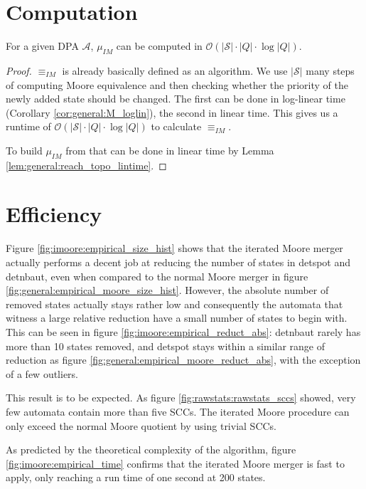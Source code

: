 \section{Computation}
\begin{lem}
	For a given DPA $\mathcal{A}$, $\mu_{IM}$ can be computed in $\mathcal{O}(|\mathcal{S}| \cdot |Q| \cdot \log |Q|)$.
\end{lem}

\begin{proof}
	$\equiv_{IM}$ is already basically defined as an algorithm. We use $|\mathcal{S}|$ many steps of computing Moore equivalence and then checking whether the priority of the newly added state should be changed. The first can be done in log-linear time (Corollary \ref{cor:general:M_loglin}), the second in linear time. This gives us a runtime of $\mathcal{O}(|\mathcal{S}| \cdot |Q| \cdot \log |Q|)$ to calculate $\equiv_{IM}$.

	To build $\mu_{IM}$ from that can be done in linear time by Lemma \ref{lem:general:reach_topo_lintime}.
\end{proof}


\section{Efficiency}
Figure \ref{fig:imoore:empirical_size_hist} shows that the iterated Moore merger actually performs a decent job at reducing the number of states in \textsf{detspot} and \textsf{detnbaut}, even when compared to the normal Moore merger in figure \ref{fig:general:empirical_moore_size_hist}. However, the absolute number of removed states actually stays rather low and consequently the automata that witness a large relative reduction have a small number of states to begin with. This can be seen in figure \ref{fig:imoore:empirical_reduct_abs}: \textsf{detnbaut} rarely has more than 10 states removed, and \textsf{detspot} stays within a similar range of reduction as figure \ref{fig:general:empirical_moore_reduct_abs}, with the exception of a few outliers.

This result is to be expected. As figure \ref{fig:rawstats:rawstats_sccs} showed, very few automata contain more than five SCCs. The iterated Moore procedure can only exceed the normal Moore quotient by using trivial SCCs.

As predicted by the theoretical complexity of the algorithm, figure \ref{fig:imoore:empirical_time} confirms that the iterated Moore merger is fast to apply, only reaching a run time of one second at 200 states.


